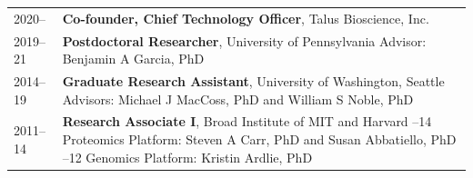 \documentclass[11pt]{article}
\begin{document}
\begin{tabular}{V}
  2020--     & {\bf Co-founder, Chief Technology Officer}, Talus Bioscience, Inc.\\
  2019--21   & {\bf Postdoctoral Researcher}, University of Pennsylvania
             \newline Advisor: Benjamin A Garcia, PhD\\
  2014--19 & {\bf Graduate Research Assistant}, University of Washington,
             Seattle
             \newline Advisors: Michael J MacCoss, PhD and William S Noble, PhD\\
  2011--14 & {\bf Research Associate I}, Broad Institute of MIT and Harvard
             --14 Proteomics Platform: Steven A Carr, PhD and Susan Abbatiello, PhD
             --12 Genomics Platform: Kristin Ardlie, PhD\\
\end{tabular}
\end{document}
